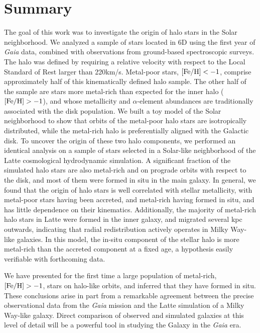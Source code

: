 \documentclass[apj, twocolappendix, numberedappendix, appendixfloats]{emulateapj}
\begin{document}
\section{Summary}
\label{sec:summary}
The goal of this work was to investigate the origin of halo stars in the Solar neighborhood.
We analyzed a sample of stars located in 6D using the first year of \emph{Gaia} data, combined with observations from ground-based spectroscopic surveys.
The halo was defined by requiring a relative velocity with respect to the Local Standard of Rest larger than 220\;km/s.
Metal-poor stars, $\rm[Fe/H]<-1$, comprise approximately half of this kinematically defined halo sample.
The other half of the sample are stars more metal-rich than expected for the inner halo ($\rm[Fe/H]>-1$), and whose metallicity and $\alpha$-element abundances are traditionally associated with the disk population.
We built a toy model of the Solar neighborhood to show that orbits of the metal-poor halo stars are isotropically distributed, while the metal-rich halo is preferentially aligned with the Galactic disk.
To uncover the origin of these two halo components, we performed an identical analysis on a sample of stars selected in a Solar-like neighborhood of the Latte cosmological hydrodynamic simulation.
A significant fraction of the simulated halo stars are also metal-rich and on prograde orbits with respect to the disk, and most of them were formed in situ in the main galaxy.
In general, we found that the origin of halo stars is well correlated with stellar metallicity, with metal-poor stars having been accreted, and metal-rich having formed in situ, and has little dependence on their kinematics.
Additionally, the majority of metal-rich halo stars in Latte were formed in the inner galaxy, and migrated several kpc outwards, indicating that radial redistribution actively operates in Milky Way-like galaxies.
In this model, the in-situ component of the stellar halo is more metal-rich than the accreted component at a fixed age, a hypothesis easily verifiable with forthcoming data.

We have presented for the first time a large population of metal-rich, $\rm[Fe/H]>-1$, stars on halo-like orbits, and inferred that they have formed in situ.
These conclusions arise in part from a remarkable agreement between the precise observational data from the \emph{Gaia} mission and the Latte simulation of a Milky Way-like galaxy.
Direct comparison of observed and simulated galaxies at this level of detail will be a powerful tool in studying the Galaxy in the \emph{Gaia} era.
\end{document}
